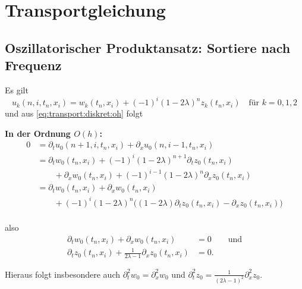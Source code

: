 \section{Transportgleichung}
\subsection{Oszillatorischer Produktansatz: Sortiere nach Frequenz}

Es gilt
\[ u_k(n, i, t_n, x_i) = w_k(t_n, x_i) + (-1)^i (1 - 2\lambda)^n z_k(t_n, x_i) \quad \text{für $k = 0,1,2$} \]
und aus \eqref{eq:transport:diskret:oh} folgt 

\vspace{0.4cm}
\noindent \textbf{In der Ordnung $O(h)$:}
\begin{align*}
0 &= \partial_t u_0(n+1, i, t_n, x_i) + \partial_x u_0(n, i-1, t_n, x_i)\\
&= \partial_t w_0(t_n, x_i) + (-1)^i (1 - 2\lambda)^{n+1} \partial_t z_0(t_n, x_i)\\
&\qquad + \partial_x w_0(t_n, x_i) + (-1)^{i-1} (1 - 2\lambda)^n \partial_x z_0(t_n, x_i)\\
&= \partial_t w_0(t_n, x_i) + \partial_x w_0(t_n, x_i)\\
&\qquad + (-1)^i (1 - 2\lambda)^n \bigl( (1 - 2\lambda) \partial_t z_0(t_n, x_i) - \partial_x z_0(t_n, x_i) \bigr) \\
\end{align*}

also
\begin{align*}
\partial_t w_0(t_n, x_i) + \partial_x w_0(t_n, x_i) &= 0 \qquad \text{und}\\
\partial_t z_0(t_n, x_i) + \frac {1}{2\lambda - 1} \partial_x z_0(t_n, x_i) &= 0.
\end{align*}

Hieraus folgt insbesondere auch $\partial^2_t w_0 = \partial^2_x w_0$ und $\partial^2_t z_0 = \frac {1}{(2\lambda - 1)^2} \partial^2_x z_0$.

